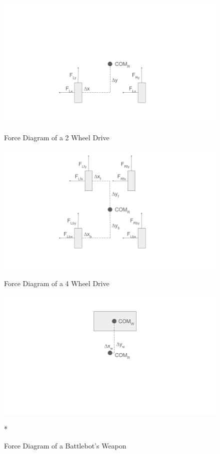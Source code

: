 \documentclass[conference]{IEEEtran}
\begin{document}
\begin{figure}[htbp]
    \centering
    \begin{minipage}[b]{0.4\textwidth}
        \includegraphics[width=\textwidth]{2WD.png}
        \caption{Force Diagram of a 2 Wheel Drive}
        \label{fig:rrt}
    \end{minipage}
    \hfill
    \begin{minipage}[b]{0.4\textwidth}
        \includegraphics[width=\textwidth]{4WD.png}
        \caption{Force Diagram of a 4 Wheel Drive}
        \label{fig:kinorrt}
    \end{minipage}
    \hfill
    \begin{minipage}[b]{0.4\textwidth}
        \includegraphics[width=\textwidth]{weapon.png}
        \caption{Force Diagram of a Battlebot's Weapon}
        \label{fig:kinorrt}
    \end{minipage}
*
\end{figure}
\end{document}
